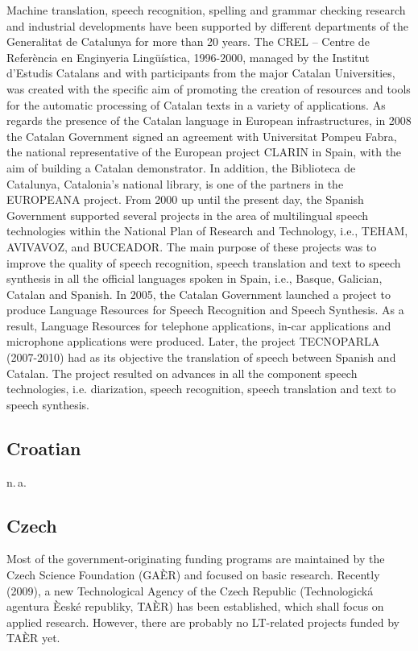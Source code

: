 \documentclass[10pt, plain]{../../metanetpaper}
\begin{document}
\begin{multicols}{2}
\begin{small}
Machine translation, speech recognition, spelling and grammar checking research and industrial developments have been supported by different departments of the Generalitat de Catalunya for more than 20 years. The CREL – Centre de Referència en Enginyeria Lingüística, 1996-2000, managed by the Institut d’Estudis Catalans and with participants from the major Catalan Universities, was created with the specific aim of promoting the creation of resources and tools for the automatic processing of Catalan texts in a variety of applications. As regards the presence of the Catalan language in European infrastructures, in 2008 the Catalan Government signed an agreement with Universitat Pompeu Fabra, the national representative of the European project CLARIN in Spain, with the aim of building a Catalan demonstrator. In addition, the Biblioteca de Catalunya, Catalonia’s national library, is one of the partners in the EUROPEANA project. From 2000 up until the present day, the Spanish Government supported several projects in the area of multilingual speech technologies within the National Plan of Research and Technology, i.e., TEHAM, AVIVAVOZ, and BUCEADOR. The main purpose of these projects was to improve the quality of speech recognition, speech translation and text to speech synthesis in all the official languages spoken in Spain, i.e., Basque, Galician, Catalan and Spanish. In 2005, the Catalan Government launched a project to produce Language Resources for Speech Recognition and Speech Synthesis. As a result, Language Resources for telephone applications, in-car applications and microphone applications were produced. Later, the project TECNOPARLA (2007-2010) had as its objective the translation of speech between Spanish and Catalan. The project resulted on advances in all the component speech technologies, i.e. diarization, speech recognition, speech translation and text to speech synthesis.

\subsection*{Croatian}
\label{sec:croatian}

n.\,a.

\subsection*{Czech}
\label{sec:czech}

Most of the government-originating funding programs are maintained by the Czech Science Foundation (GAÈR) and focused on basic research. Recently (2009), a new Technological Agency of the Czech Republic (Technologická agentura Èeské republiky, TAÈR) has been established, which shall focus on applied research. However, there are probably no LT-related projects funded by TAÈR yet. 


\end{small}
\end{multicols}
\end{document}
